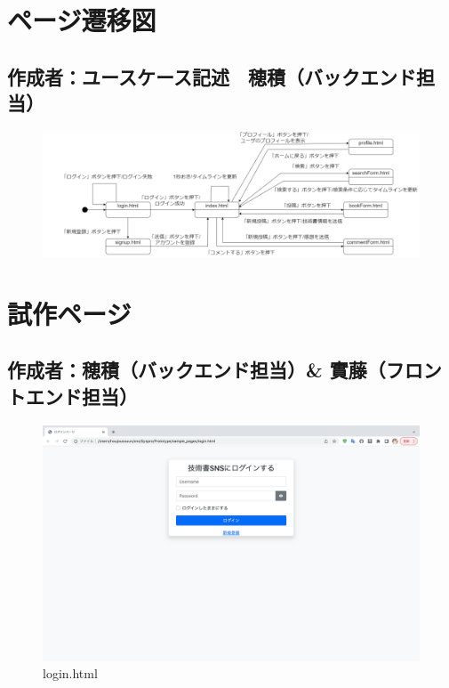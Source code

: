 \documentclass[dvipdfmx]{jsarticle}
\begin{document}
    \newpage

    
    \section*{ページ遷移図}
    \subsection*{\rm{作成者：ユースケース記述　穂積（バックエンド担当）}}
    \begin{figure}[H]
        \begin{center}
            \includegraphics[scale=0.5,clip]{pictures/pageSenni_1.png}
        \end{center}
    \end{figure}

    

    \newpage

    \section*{試作ページ}
    \subsection*{\rm{作成者：穂積（バックエンド担当）\& 實藤（フロントエンド担当）}}
    \begin{figure}[H]
        \begin{center}
            \caption*{login.html}
            \includegraphics[scale=0.3,clip]{pictures/login.png}
        \end{center}
    \end{figure}
\end{document}
